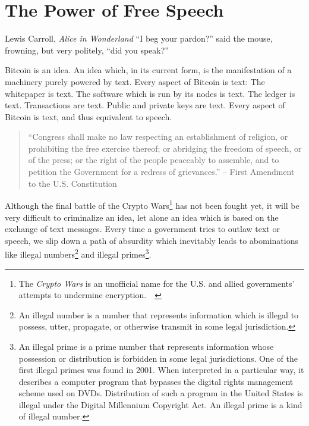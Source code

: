 \chapter{The Power of Free Speech}
\label{les:6}

\begin{chapquote}{Lewis Carroll, \textit{Alice in Wonderland}}
``I beg your pardon?'' said the mouse, frowning, but very politely, ``did you speak?''
\end{chapquote}

Bitcoin is an idea. An idea which, in its current form, is the
manifestation of a machinery purely powered by text. Every aspect of
Bitcoin is text: The whitepaper is text. The software which is run by
its nodes is text. The ledger is text. Transactions are text. Public and
private keys are text. Every aspect of Bitcoin is text, and thus
equivalent to speech.

\begin{quotation}
``Congress shall make no law respecting an establishment of religion,
or prohibiting the free exercise thereof; or abridging the freedom of
speech, or of the press; or the right of the people peaceably to
assemble, and to petition the Government for a redress of grievances.''
\flushright -- First Amendment to the U.S. Constitution
\end{quotation}

Although the final battle of the Crypto Wars\footnote{The \textit{Crypto Wars}
is an unofficial name for the U.S. and allied governments' attempts to undermine
encryption.~\cite{eff-cryptowars}~\cite{wiki:cryptowars}} has not been fought
yet, it will be very difficult to criminalize an idea, let alone an idea which
is based on the exchange of text messages. Every time a government tries to
outlaw text or speech, we slip down a path of absurdity which inevitably leads
to abominations like illegal numbers\footnote{An illegal number is a number that
represents information which is illegal to possess, utter, propagate, or
otherwise transmit in some legal jurisdiction.\cite{wiki:illegal-number}} and
illegal primes\footnote{An illegal prime is a prime number that represents
information whose possession or distribution is forbidden in some legal
jurisdictions. One of the first illegal primes was found in 2001. When
interpreted in a particular way, it describes a computer program that bypasses
the digital rights management scheme used on DVDs. Distribution of such a
program in the United States is illegal under the Digital Millennium Copyright
Act. An illegal prime is a kind of illegal number.\cite{wiki:illegal-prime}}.

